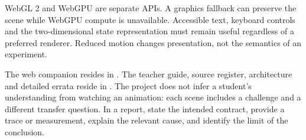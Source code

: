 {  \par WebGL 2 and WebGPU are separate APIs. A graphics fallback can preserve the scene while WebGPU compute is unavailable. Accessible text, keyboard controls and the two-dimensional state representation must remain useful regardless of a preferred renderer. Reduced motion changes presentation, not the semantics of an experiment.

  \par The web companion resides in . The teacher guide, source register, architecture and detailed errata reside in . The project does not infer a student's understanding from watching an animation: each scene includes a challenge and a different transfer question. In a report, state the intended contract, provide a trace or measurement, explain the relevant cause, and identify the limit of the conclusion.
}
